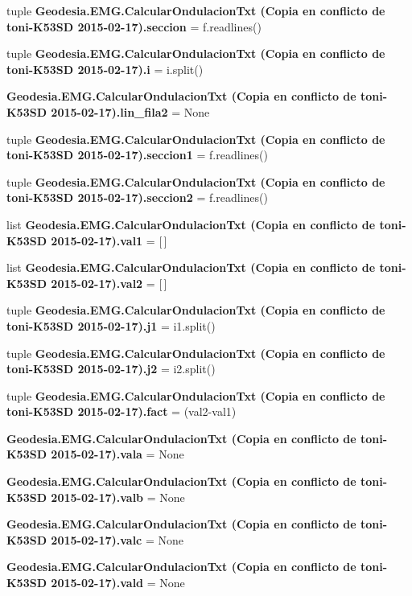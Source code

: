 \begin{DoxyCompactItemize}
\item 
tuple {\bf Geodesia.\-E\-M\-G.\-Calcular\-Ondulacion\-Txt (\-Copia en conflicto de toni-\/\-K53\-S\-D 2015-\/02-\/17).\-seccion} = f.\-readlines()
\item 
tuple {\bf Geodesia.\-E\-M\-G.\-Calcular\-Ondulacion\-Txt (\-Copia en conflicto de toni-\/\-K53\-S\-D 2015-\/02-\/17).\-i} = i.\-split()
\item 
{\bf Geodesia.\-E\-M\-G.\-Calcular\-Ondulacion\-Txt (\-Copia en conflicto de toni-\/\-K53\-S\-D 2015-\/02-\/17).\-lin\-\_\-fila2} = None
\item 
tuple {\bf Geodesia.\-E\-M\-G.\-Calcular\-Ondulacion\-Txt (\-Copia en conflicto de toni-\/\-K53\-S\-D 2015-\/02-\/17).\-seccion1} = f.\-readlines()
\item 
tuple {\bf Geodesia.\-E\-M\-G.\-Calcular\-Ondulacion\-Txt (\-Copia en conflicto de toni-\/\-K53\-S\-D 2015-\/02-\/17).\-seccion2} = f.\-readlines()
\item 
list {\bf Geodesia.\-E\-M\-G.\-Calcular\-Ondulacion\-Txt (\-Copia en conflicto de toni-\/\-K53\-S\-D 2015-\/02-\/17).\-val1} = [$\,$]
\item 
list {\bf Geodesia.\-E\-M\-G.\-Calcular\-Ondulacion\-Txt (\-Copia en conflicto de toni-\/\-K53\-S\-D 2015-\/02-\/17).\-val2} = [$\,$]
\item 
tuple {\bf Geodesia.\-E\-M\-G.\-Calcular\-Ondulacion\-Txt (\-Copia en conflicto de toni-\/\-K53\-S\-D 2015-\/02-\/17).\-j1} = i1.\-split()
\item 
tuple {\bf Geodesia.\-E\-M\-G.\-Calcular\-Ondulacion\-Txt (\-Copia en conflicto de toni-\/\-K53\-S\-D 2015-\/02-\/17).\-j2} = i2.\-split()
\item 
tuple {\bf Geodesia.\-E\-M\-G.\-Calcular\-Ondulacion\-Txt (\-Copia en conflicto de toni-\/\-K53\-S\-D 2015-\/02-\/17).\-fact} = (val2-\/val1)
\item 
{\bf Geodesia.\-E\-M\-G.\-Calcular\-Ondulacion\-Txt (\-Copia en conflicto de toni-\/\-K53\-S\-D 2015-\/02-\/17).\-vala} = None
\item 
{\bf Geodesia.\-E\-M\-G.\-Calcular\-Ondulacion\-Txt (\-Copia en conflicto de toni-\/\-K53\-S\-D 2015-\/02-\/17).\-valb} = None
\item 
{\bf Geodesia.\-E\-M\-G.\-Calcular\-Ondulacion\-Txt (\-Copia en conflicto de toni-\/\-K53\-S\-D 2015-\/02-\/17).\-valc} = None
\item 
{\bf Geodesia.\-E\-M\-G.\-Calcular\-Ondulacion\-Txt (\-Copia en conflicto de toni-\/\-K53\-S\-D 2015-\/02-\/17).\-vald} = None
\item 

\end{DoxyCompactItemize}
